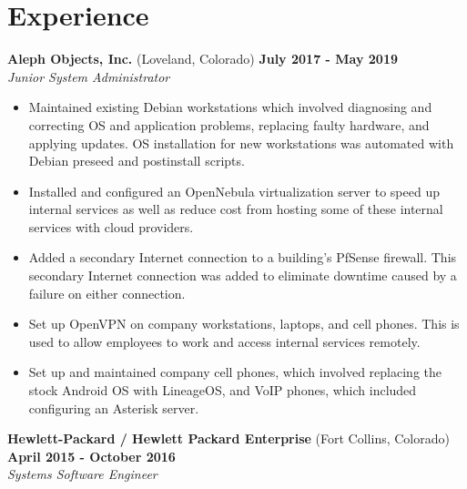\documentclass[letterpaper,10pt]{article}
\begin{document}
    \section*{Experience}
        \textbf{Aleph Objects, Inc.} (Loveland, Colorado) \hfill \textbf{July 2017 - May 2019} \\[1pt]
        \emph{Junior System Administrator}
        \begin{itemize}
            \item Maintained existing Debian workstations which involved diagnosing and correcting OS and application problems, replacing faulty hardware, and applying updates. OS installation for new workstations was automated with Debian preseed and postinstall scripts.
            \item Installed and configured an OpenNebula virtualization server to speed up internal services as well as reduce cost from hosting some of these internal services with cloud providers.
            \item Added a secondary Internet connection to a building's PfSense firewall. This secondary Internet connection was added to eliminate downtime caused by a failure on either connection.
            \item Set up OpenVPN on company workstations, laptops, and cell phones. This is used to allow employees to work and access internal services remotely.
            \item Set up and maintained company cell phones, which involved replacing the stock Android OS with LineageOS, and VoIP phones, which included configuring an Asterisk server.
        \end{itemize}
        \vspace*{1.5ex}
        \textbf{Hewlett-Packard / Hewlett Packard Enterprise} (Fort Collins, Colorado) \hfill \textbf{April 2015 - October 2016} \\[1pt]
        \emph{Systems Software Engineer}
\end{document}
